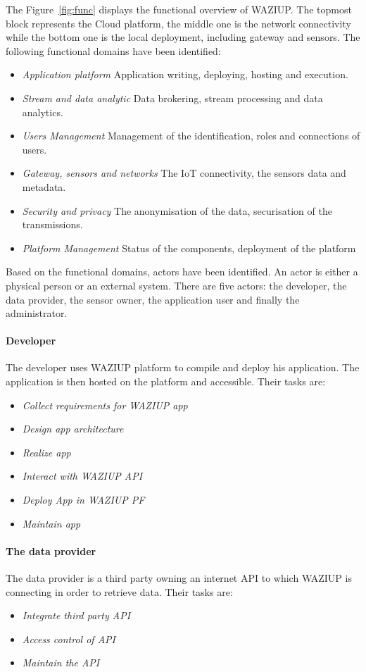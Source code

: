 The Figure~\ref{fig:func} displays the functional overview of WAZIUP.
The topmost block represents the Cloud platform, the middle one is the network connectivity while the bottom one is the local deployment, including gateway and sensors.
The following functional domains have been identified:

\begin{itemize}
  \item \emph{Application platform}
	Application writing, deploying, hosting and execution.
  \item \emph{Stream and data analytic}
	Data brokering, stream processing and data analytics.
  \item \emph{Users Management}
	Management of the identification, roles and connections of users.
  \item \emph{Gateway, sensors and networks}
	The IoT connectivity, the sensors data and metadata.
  \item \emph{Security and privacy}
	The anonymisation of the data, securisation of the transmissions.
  \item \emph{Platform Management}
	Status of the components, deployment of the platform
\end{itemize}

Based on the functional domains, actors have been identified. 
An actor is either a physical person or an external system. 
There are five actors: the developer, the data provider, the sensor owner, the application user and finally the administrator.

\paragraph{Developer}
The developer uses WAZIUP platform to compile and deploy his application. 
The application is then hosted on the platform and accessible. 
Their tasks are:
\begin{itemize}
	\item \emph{Collect requirements for WAZIUP app}
	\item \emph{Design app architecture}
	\item \emph{Realize app}
	\item \emph{Interact with WAZIUP API}
	\item \emph{Deploy App in WAZIUP PF}
	\item \emph{Maintain app}
\end{itemize}

\paragraph{The data provider}
The data provider is a third party owning an internet API to which WAZIUP is connecting in order to retrieve data. 
Their tasks are:
\begin{itemize}
	\item \emph{Integrate third party API}
	\item \emph{Access control of API}
	\item \emph{Maintain the API}
\end{itemize}

